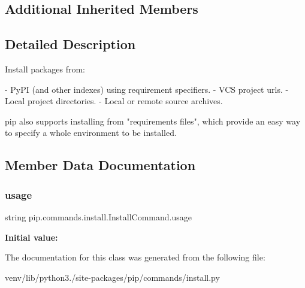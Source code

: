 \subsection*{Additional Inherited Members}


\subsection{Detailed Description}
\begin{DoxyVerb}Install packages from:

- PyPI (and other indexes) using requirement specifiers.
- VCS project urls.
- Local project directories.
- Local or remote source archives.

pip also supports installing from "requirements files", which provide
an easy way to specify a whole environment to be installed.
\end{DoxyVerb}
 

\subsection{Member Data Documentation}
\mbox{\label{classpip_1_1commands_1_1install_1_1_install_command_a4eb6f96bbe320ddd96da4756d9a01679}} 
\subsubsection{\texorpdfstring{usage}{usage}}
{\footnotesize\ttfamily string pip.\+commands.\+install.\+Install\+Command.\+usage\hspace{0.3cm}{\ttfamily [static]}}

{\bfseries Initial value\+:}
\begin{DoxyCode}
=  \textcolor{stringliteral}{"""}
\textcolor{stringliteral}{  %
\textcolor{stringliteral}{  %
\textcolor{stringliteral}{  %
\textcolor{stringliteral}{  %
\textcolor{stringliteral}{  %
\end{DoxyCode}


The documentation for this class was generated from the following file\+:\begin{DoxyCompactItemize}
\item 
venv/lib/python3./site-\/packages/pip/commands/install.\+py\end{DoxyCompactItemize}
